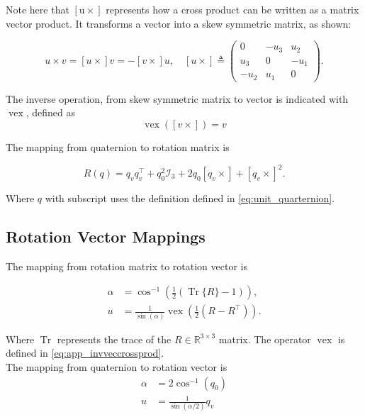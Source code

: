 Note here that $\left[\mathrm{u} \times\right]$ represents how  a cross product can be written as a matrix vector product. It transforms a vector into a skew symmetric matrix, as shown:

\begin{equation}
	\label{eq:app_veccrossprod}
	u \times v=[u \times] v=-[v \times] u, \quad[u \times] \triangleq\left(\begin{array}{ccc}{0} & {-u_{3}} & {u_{2}} \\ {u_{3}} & {0} & {-u_{1}} \\ {-u_{2}} & {u_{1}} & {0}\end{array}\right).
\end{equation}

The inverse operation, from skew symmetric matrix to vector is indicated with $\operatorname{vex}$, defined as
\begin{equation}
	\label{eq:app_invveccrossprod}
	\operatorname{vex}([v \times]) = v
\end{equation}

The mapping from quaternion to rotation matrix is

\begin{equation}
	\label{eqapp_:quat2rotmat}
	R(q) = q_{v} q_{v}^{\top}+q_{0}^{2} \mathcal{I}_{3}+2 q_{0}\left[q_{v} \times\right]+\left[q_{v} \times\right]^{2}.
\end{equation}

Where $q$ with subscript uses the definition defined in \eqref{eq:unit_quarternion}.


\subsection{Rotation Vector Mappings}
The mapping from rotation matrix to rotation vector is 

\begin{subequations}
	\begin{align}
		\label{eq:app_rotmat2rotvec}
		\alpha &= \cos ^{-1}\left(\frac{1}{2}(\operatorname{Tr}\{R\}-1)\right),
		\\
		u &= \frac{1}{\sin (\alpha)} \operatorname{vex}\left(\frac{1}{2}\left(R-R^{\top}\right)\right).
	\end{align}
\end{subequations}



Where $\operatorname{Tr}$ represents the trace of the $R \in \mathbb{R}^{3 \times 3}$ matrix. The operator $\operatorname{vex}$ is defined in \eqref{eq:app_invveccrossprod}.\\
The mapping from quaternion to rotation vector is 
\begin{subequations}
	\begin{align}
		\label{eq:quat2rotvec}
		\alpha &=2 \cos ^{-1}\left(q_{0}\right) \\ 
		u &=\frac{1}{\sin (\alpha / 2)} q_v 
	\end{align}
\end{subequations}


